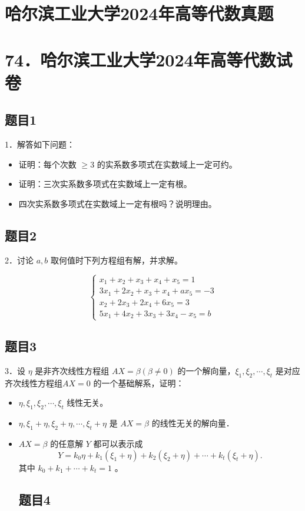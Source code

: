 \documentclass{article}
\begin{document}
\section*{哈尔滨工业大学2024年高等代数真题}
\section*{74．哈尔滨工业大学2024年高等代数试卷}

\subsection{题目1}
1．解答如下问题：

\begin{itemize}
  \item[（1）] 证明：每个次数 \(\geq 3\) 的实系数多项式在实数域上一定可约。
  \item[（2）] 证明：三次实系数多项式在实数域上一定有根。
  \item[（3）] 四次实系数多项式在实数域上一定有根吗？说明理由。
\end{itemize}

\subsection{题目2}
2．讨论 \(a, b\) 取何值时下列方程组有解，并求解。

\[
\left\{\begin{array}{l}
x_{1}+x_{2}+x_{3}+x_{4}+x_{5}=1 \\
3 x_{1}+2 x_{2}+x_{3}+x_{4}+a x_{5}=-3 \\
x_{2}+2 x_{3}+2 x_{4}+6 x_{5}=3 \\
5 x_{1}+4 x_{2}+3 x_{3}+3 x_{4}-x_{5}=b
\end{array}\right.
\]

\subsection{题目3}
3．设 \(\eta\) 是非齐次线性方程组 \(A X=\beta(\beta \neq 0)\) 的一个解向量，\(\xi_{1}, \xi_{2}, \cdots, \xi_{t}\) 是对应齐次线性方程组\(A X=0\) 的一个基础解系，证明：

\begin{itemize}
  \item[（1）] \(\eta, \xi_{1}, \xi_{2}, \cdots, \xi_{t}\) 线性无关。
  \item[（2）] \(\eta, \xi_{1}+\eta, \xi_{2}+\eta, \cdots, \xi_{t}+\eta\) 是 \(A X=\beta\) 的线性无关的解向量．
  \item[（3）] \(A X=\beta\) 的任意解 \(Y\) 都可以表示成
\[
Y=k_{0} \eta+k_{1}\left(\xi_{1}+\eta\right)+k_{2}\left(\xi_{2}+\eta\right)+\cdots+k_{t}\left(\xi_{t}+\eta\right) .
\]
其中 \(k_{0}+k_{1}+\cdots+k_{t}=1\) 。

\subsection{题目4}
\end{itemize}
\end{document}
